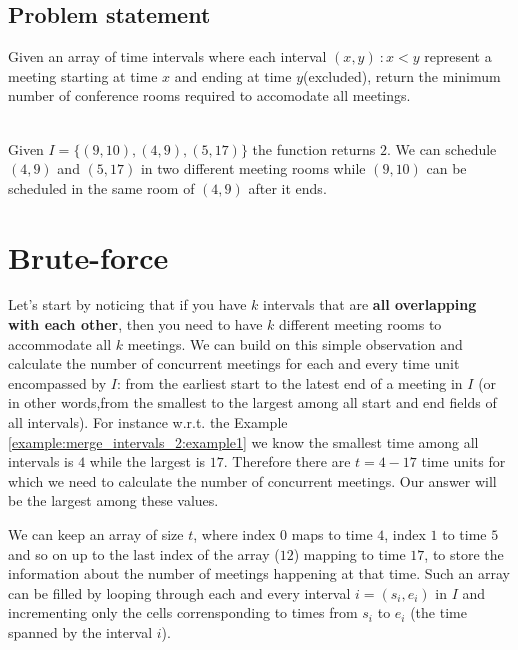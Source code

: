 \subsection{Problem statement}
\begin{exercise}
	\label{example:merge_intervals_2:exercice1_2}
	Given an array of time intervals where each interval $(x,y) \: : x < y$ represent a meeting starting at time $x$ and ending at time $y$(excluded), return the minimum number of conference rooms required to accomodate all meetings.
	
		\begin{example}
			\label{example:merge_intervals_2:example1}
			\hfill \\
			Given $I=\{(9,10),(4,9),(5,17)\}$ the function returns $2$. We can schedule $(4,9)$ and $(5,17)$ in two different meeting rooms while $(9,10)$ can be scheduled in the same room of $(4,9)$ after it ends. 
		\end{example}
	
	\end{exercise}
	

\section{Brute-force}
Let's start by noticing that if you have $k$ intervals that are \textbf{all overlapping with each other}, then you need to have $k$ different meeting rooms to accommodate all $k$ meetings.
We can build on this simple observation and calculate the number of concurrent meetings for each and every time unit encompassed by $I$: from the earliest start to the latest end of a meeting in $I$ (or in other words,from the smallest to the largest among all start and end fields of all intervals). 
For instance w.r.t. the Example \ref{example:merge_intervals_2:example1} we know the smallest time among all intervals is $4$ while the largest is $17$.
Therefore there are $t=4-17$ time units for which we need to calculate the number of concurrent meetings. 
Our answer will be the largest among these values.

We can keep an array of size $t$, where index $0$ maps to time $4$, index $1$ to time $5$ and so on up to the last index of the array ($12$) mapping to time $17$,
to store the information about the number of meetings happening at that time.
Such an array can be filled by looping through each and every interval $i=(s_i, e_i)$ in $I$ and incrementing only the cells corrensponding to times from $s_i$ to $e_i$ (the time spanned by the interval $i$). 


